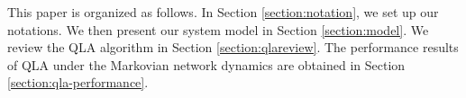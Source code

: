 \documentclass[journal]{IEEEtran}
\begin{document}


%

This paper is organized as follows. In Section \ref{section:notation}, we set up our  notations. We then present our system model in Section \ref{section:model}. We review the QLA algorithm in Section \ref{section:qlareview}. The performance results of QLA under the Markovian network dynamics are obtained in Section \ref{section:qla-performance}. 
\end{document}
